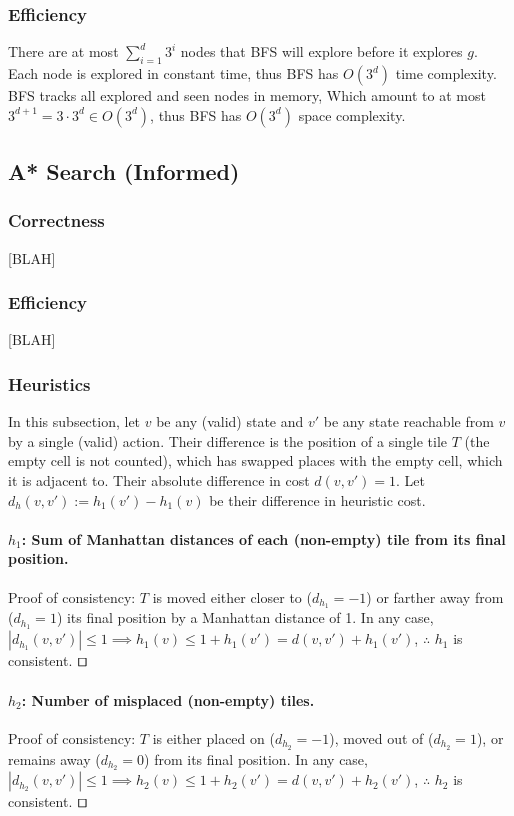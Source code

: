 \documentclass[runningheads]{llncs}
\begin{document}
\subsubsection{Efficiency}
There are at most $\sum_{i=1}^d 3^i$ nodes that BFS will explore before it explores $g$. Each node is explored in constant time, thus BFS has $O(3^d)$ time complexity. BFS tracks all explored and seen nodes in memory, Which amount to at most $3^{d+1} = 3 \cdot 3^d \in O(3^d)$, thus BFS has $O(3^d)$ space complexity.

\subsection{A* Search (Informed)}
\subsubsection{Correctness}
[BLAH]

\subsubsection{Efficiency}
[BLAH]

\subsubsection{Heuristics}
In this subsection, let $v$ be any (valid) state and $v'$ be any state reachable from $v$ by a single (valid) action. Their difference is the position of a single tile $T$ (the empty cell is not counted), which has swapped places with the empty cell, which it is adjacent to. Their absolute difference in cost $d(v,v') = 1$. Let $d_h(v,v') := h_1(v')-h_1(v)$ be their difference in heuristic cost.

\paragraph{$h_1$: Sum of Manhattan distances of each (non-empty) tile from its final position.}
Proof of consistency: $T$ is moved either closer to ($d_{h_1} = -1$) or farther away from ($d_{h_1} = 1$) its final position by a Manhattan distance of 1.
In any case, $|d_{h_1}(v,v')|\leq 1 \implies h_1(v) \leq 1+h_1(v') = d(v,v')+h_1(v')$, $\therefore$ $h_1$ is consistent. $\qed$

\paragraph{$h_2$: Number of misplaced (non-empty) tiles.}
Proof of consistency: $T$ is either placed on ($d_{h_2} = -1$), moved out of ($d_{h_2} = 1$), or remains away ($d_{h_2} = 0$) from its final position.
In any case, $|d_{h_2}(v,v')|\leq 1 \implies h_2(v) \leq 1+h_2(v') = d(v,v')+h_2(v')$, $\therefore$ $h_2$ is consistent. $\qed$
\end{document}
